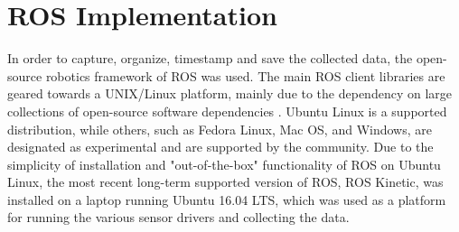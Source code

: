 \section{ROS Implementation}
In order to capture, organize, timestamp and save the collected data, the open-source robotics framework of ROS was used. The main ROS client libraries are geared towards a UNIX/Linux platform, mainly due to the dependency on large collections of open-source software dependencies . Ubuntu Linux is a supported distribution, while others, such as Fedora Linux, Mac OS, and Windows, are designated as experimental and are supported by the community. Due to the simplicity of installation and "out-of-the-box" functionality of ROS on Ubuntu Linux, the most recent long-term supported version of ROS, ROS Kinetic, was installed on a laptop running Ubuntu 16.04 LTS, which was used as a platform for running the various sensor drivers and collecting the data.
